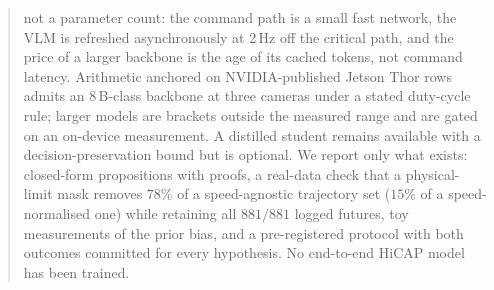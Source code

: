 \documentclass[10pt,a4paper]{article}
\begin{document}
\begin{abstract}
not a parameter count: the command path is a small fast network, the VLM is refreshed asynchronously at 2\,Hz off the critical path, and the price of a larger backbone is the age of its cached tokens, not command latency.
Arithmetic anchored on NVIDIA-published Jetson Thor rows admits an 8\,B-class backbone at three cameras under a stated duty-cycle rule; larger models are brackets outside the measured range and are gated on an on-device measurement.
A distilled student remains available with a decision-preservation bound but is optional. We report only what exists: closed-form propositions with proofs, a real-data check that a physical-limit mask
removes $78\%$ of a speed-agnostic trajectory set ($15\%$ of a speed-normalised one) while retaining all $881/881$ logged futures, toy measurements of the prior bias, and a pre-registered
protocol with both outcomes committed for every hypothesis. No end-to-end HiCAP model has been trained.
\end{abstract}

















\appendix

\end{document}
